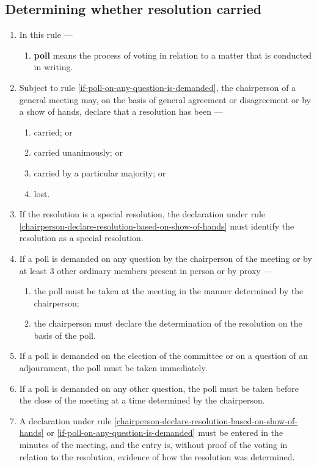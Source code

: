\documentclass[../constitution.tex]{subfiles}
\begin{document}
\hypertarget{determining-whether-resolution-carried}{%
\subsection{Determining whether resolution carried}\label{determining-whether-resolution-carried}}

\begin{enumerate}

\item In this rule ---

  \begin{enumerate}
  
  \item \textbf{poll} means the process of voting in relation to a matter that is conducted in writing.
  \end{enumerate}
\item Subject to rule \ref{if-poll-on-any-question-is-demanded}, the chairperson of a general meeting may, on the basis of general agreement or disagreement or by a show of hands, declare that a resolution has been --- \label{chairperson-declare-resolution-based-on-show-of-hands}

  \begin{enumerate}
  
  \item carried; or
  \item carried unanimously; or
  \item carried by a particular majority; or
  \item lost.
  \end{enumerate}
\item If the resolution is a special resolution, the declaration under rule \ref{chairperson-declare-resolution-based-on-show-of-hands} must identify the resolution as a special resolution.
\item If a poll is demanded on any question by the chairperson of the meeting or by at least 3 other ordinary members present in person or by proxy --- \label{if-poll-on-any-question-is-demanded}

  \begin{enumerate}
  
  \item the poll must be taken at the meeting in the manner determined by the chairperson;
  \item the chairperson must declare the determination of the resolution on the basis of the poll.
  \end{enumerate}
\item If a poll is demanded on the election of the committee or on a question of an adjournment, the poll must be taken immediately.
\item If a poll is demanded on any other question, the poll must be taken before the close of the meeting at a time determined by the chairperson.
\item A declaration under rule \ref{chairperson-declare-resolution-based-on-show-of-hands} or \ref{if-poll-on-any-question-is-demanded} must be entered in the minutes of the meeting, and the entry is, without proof of the voting in relation to the resolution, evidence of how the resolution was determined.
\end{enumerate}
\end{document}
